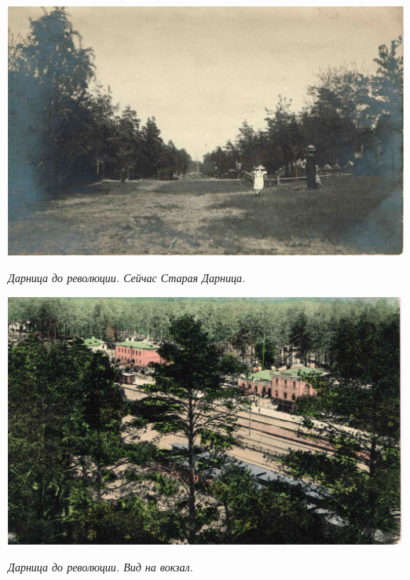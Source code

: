 \begin{center}
\includegraphics[width=\linewidth]{lpix/darn01.jpg}

\textit{Дарница до революции. Сейчас Старая Дарница.}
\end{center}


\begin{center}
\includegraphics[width=\linewidth]{lpix/darn02.jpg}

\textit{Дарница до революции. Вид на вокзал.}
\end{center}

\vspace*{\fill}

\newpage

\vspace*{\fill}

